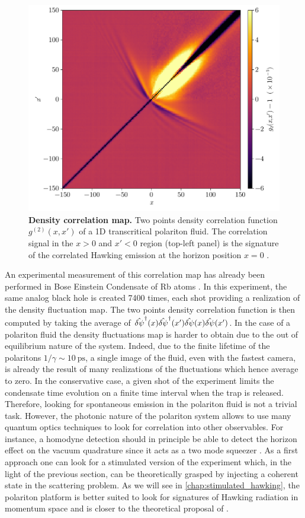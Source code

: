 \begin{figure}[t!]
    \centering
    \includegraphics[width=1\textwidth]{chap_AG_theory/fig/g2_position.pdf}
    \caption{\textbf{Density correlation map.} Two points density correlation function $g^{(2)}(x,x')$ of a 1D transcritical polariton fluid. The correlation signal
    in the $x>0$ and $x'<0$ region (top-left panel) is the signature of the correlated Hawking emission at the horizon position $x=0$ .}
    \label{fig:correlation_map}
\end{figure}
An experimental measurement of this correlation map has already been performed in Bose Einstein Condensate of Rb atoms \cite{steinhauer_observation_2016}.
In this experiment, the same analog black hole is created 7400 times, each shot providing a realization of the density fluctuation map. The two points density correlation
function is then computed by taking the average of $\hat{\delta\psi}^\dagger(x)\hat{\delta\psi}^\dagger(x')\hat{\delta\psi}(x)\hat{\delta\psi}(x')$. In the case of a polariton fluid the density fluctuations map is harder to obtain due to 
the out of equilibrium nature of the system. Indeed, due to the finite lifetime of the polaritons $1/\gamma\sim \SI{10}{\pico \second}$, a single 
image of the fluid, even with the fastest camera, is already the result of many realizations of the fluctuations which hence average to zero. In the conservative case,
a given shot of the experiment limits the condensate time evolution on a finite time interval when the trap is released. Therefore, looking for spontaneous
emission in the polariton fluid is not a trivial task. However, the photonic nature of the polariton system allows to use many quantum optics techniques to look for correlation into other observables.
For instance, a homodyne detection should in principle be able to detect the horizon effect on the vacuum quadrature since it acts as a two mode squeezer \cite{agullo_symplectic_2022}. As a first approach one can look for a stimulated version of the experiment which, in the light of the previous section,
can be theoretically grasped by injecting a coherent state in the scattering problem. As we will see in \autoref{chap:stimulated_hawking}, the polariton platform is better suited
to look for signatures of Hawking radiation in momentum space and is closer to the theoretical proposal of \cite{fabbri_momentum_2018}.

